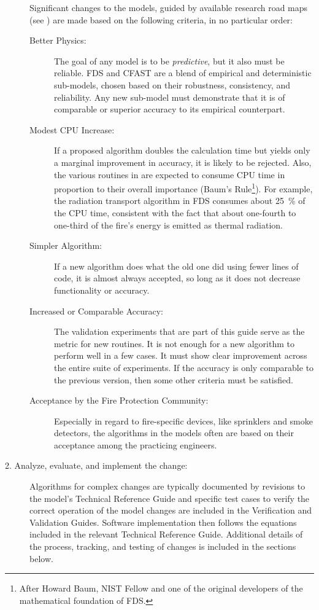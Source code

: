 \documentclass[11pt]{book}
\begin{document}
\begin{description}
    Significant changes to the models, guided by available research road maps (see ) are made based on the following criteria, in no particular order:
\begin{description}
\item[Better Physics:] The goal of any model is to be {\em predictive}, but it also must be reliable. FDS and CFAST are a blend of empirical and deterministic sub-models, chosen based on their robustness, consistency, and reliability. Any new sub-model must demonstrate that it is of comparable or superior accuracy to its empirical counterpart.
\item[Modest CPU Increase:] If a proposed algorithm doubles the calculation time but yields only a marginal improvement in accuracy, it is likely to be rejected. Also, the various routines in are expected to consume CPU time in proportion to their overall importance (Baum's Rule\footnote{After Howard Baum, NIST Fellow and one of the original developers of the mathematical foundation of FDS.}). For example, the radiation transport algorithm in FDS consumes about 25~\% of the CPU time, consistent with the fact that about one-fourth to one-third of the fire's energy is emitted as thermal radiation.
\item[Simpler Algorithm:] If a new algorithm does what the old one did using fewer lines of code, it is almost always accepted, so long as it does not decrease functionality or accuracy.
\item[Increased or Comparable Accuracy:] The validation experiments that are part of this guide serve as the metric for new routines. It is not enough for a new algorithm to perform well in a few cases. It must show clear improvement across the entire suite of experiments. If the accuracy is only comparable to the previous version, then some other criteria must be satisfied.
\item[Acceptance by the Fire Protection Community:] Especially in regard to fire-specific devices, like sprinklers and smoke detectors, the algorithms in the models often are based on their acceptance among the practicing engineers.
\end{description}
\item [2. Analyze, evaluate, and implement the change:] Algorithms for complex changes are typically documented by revisions to the model's Technical Reference Guide and specific test cases to verify the correct operation of the model changes are included in the Verification and Validation Guides. Software implementation then follows the equations included in the relevant Technical Reference Guide. Additional details of the process, tracking, and testing of changes is included in the sections below.

\end{description}
\end{document}
